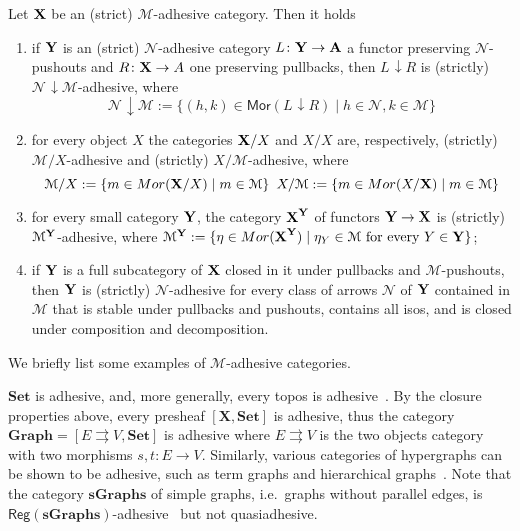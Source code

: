 \documentclass[a4paper,UKenglish,cleveref,pdftex,thm-restate,numberwithinsect]{lipics-v2021}
\newcommand{\cat}[1]{\ensuremath{\mathbf{#1}}}
\def\X{\textbf {\textup{X}}}
\def\Y{\textbf {\textup{Y}}}
\def\A{\textbf {\textup{A}}}
\newcommand{\comma}[2]{#1\hspace{1pt} {\downarrow}#2}
\newcommand{\mor}{\mathsf{Mor}}
\newcommand{\reg}{\mathsf{Reg}}
\begin{document}
\begin{proposition}
	\label{thm:slice-functors}
	Let $\X$ be an (strict) $\mathcal{M}$-adhesive category. Then it holds
	\begin{enumerate}
		\item if $\Y$ is an (strict) $\mathcal{N}$-adhesive category $L\colon \Y\to \A$ a functor preserving $\mathcal{N}$-pushouts and $R\colon \X\to A$ one preserving pullbacks, then $\comma{L}{R}$ is (strictly) $\comma{\mathcal{N}}{\mathcal{M}}$-adhesive, where
		\[\comma{\mathcal{N}}{\mathcal{M}}:=\{(h,k) \in \mor(\comma{L}{R}) \mid h\in \mathcal{N}, k\in \mathcal{M}\}\]
		\item for every object $X$
		the categories $\X/X$  and $X/X$ are, respectively, (strictly) $\mathcal{M}/X$-adhesive and (strictly) $X/\mathcal{M}$-adhesive, where
		\[\mathcal{M}/X:=\{m\in \mor(\X/X) \mid m\in
		\mathcal{M}\} \hspace{5pt} X/\mathcal{M}:=\{m\in \mor(X/\X) \mid m\in \mathcal{M}\}\]
		\item for every small category $\Y$, the category $\X^\Y$ of
		functors $\Y\to \X$ is (strictly) $\mathcal{M}^{\Y}$-adhesive, where
		$\mathcal{M}^{\Y}:=\{\eta \in \mor(\X^\Y) \mid \eta_Y \in
		\mathcal{M} \text{ for every } Y\in \Y\}$;
		\item if $\Y$ is a full subcategory of $\X$ closed in it under pullbacks and $\mathcal{M}$-pushouts, then $\Y$ is (strictly) $\mathcal{N}$-adhesive for every class of arrows $\mathcal{N}$ of $\Y$ contained in $\mathcal{M}$ that is stable under pullbacks and pushouts, contains all isos, and is closed under composition and decomposition.
	\end{enumerate} 
\end{proposition}

We briefly list some examples of $\mathcal{M}$-adhesive categories.

\begin{example}
	\label{ex:adhesive}
	$\cat{Set}$ is adhesive, and, more generally, every topos is
	adhesive~\cite{lack2006toposes}. By the closure properties above, every presheaf $[\cat{X},\cat{Set}]$ is adhesive, thus the category
	$\cat{Graph} = [ E \rightrightarrows V, \cat{Set}]$ is adhesive
	where $E \rightrightarrows {V}$ is the two objects category with two
	morphisms $s,t \colon{E} \to {V}$. Similarly, various
	categories of hypergraphs can be shown to be adhesive, such as term
	graphs and hierarchical graphs~\cite{CastelnovoGM24}. Note that the category $\cat{sGraphs}$ of simple graphs, 
	i.e.~graphs without parallel edges, is
	$\reg{(\cat{sGraphs})}$-adhesive~\cite{BehrHK23} but not
	quasiadhesive.
\end{example}
\end{document}
